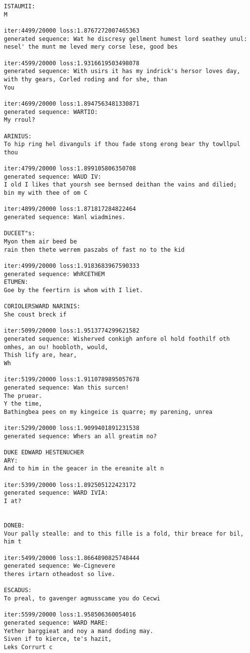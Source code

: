 \documentclass[11pt]{article}
\begin{document}
\begin{Verbatim}[commandchars=\\\{\}]
ISTAUMII:
M

iter:4499/20000 loss:1.8767272007465363
generated sequence: Wat he discresy gellment humest lord seathey unul: nesel' the munt me leved mery corse lese, good bes

iter:4599/20000 loss:1.9316619503498078
generated sequence: With usirs it has my indrick's hersor loves day, with thy gears, Corled roding and for she, than
You 

iter:4699/20000 loss:1.8947563481330871
generated sequence: WARTIO:
My rroul?

ARINIUS:
To hip ring hel divanguls if thou fade stong erong bear thy towllpul thou

iter:4799/20000 loss:1.899105806350708
generated sequence: WAUD IV:
I old I likes that yoursh see bernsed deithan the vains and dilied; bin my with thee of om C

iter:4899/20000 loss:1.871817284822464
generated sequence: Wanl wiadmines.

DUCEET"s:
Myon them air beed be
rain then thete werrem paszabs of fast no to the kid

iter:4999/20000 loss:1.9183683967590333
generated sequence: WhRCETHEM
ETUMEN:
Goe by the feertirn is whom with I liet.

CORIOLERSWARD NARINIS:
She coust breck if

iter:5099/20000 loss:1.9513774299621582
generated sequence: Wisherved conkigh anfore ol hold foothilf oth omhes, an ou! hoobloth, would,
Thish lify are, hear,
Wh

iter:5199/20000 loss:1.9110789895057678
generated sequence: Wan this surcen!
The pruear.
Y the time,
Bathingbea pees on my kingeice is quarre; my parening, unrea

iter:5299/20000 loss:1.9099401891231538
generated sequence: Whers an all greatim no?

DUKE EDWARD HESTENUCHER
ARY:
And to him in the geacer in the ereanite alt n

iter:5399/20000 loss:1.892505122423172
generated sequence: WARD IVIA:
I at?


DONEB:
Vour pally stealle: and to this fille is a fold, thir breace for bil, him t

iter:5499/20000 loss:1.8664890825748444
generated sequence: We-Cignevere
theres irtarn otheadost so live.

ESCADUS:
To preal, to gavenger agmusscame you do Cecwi

iter:5599/20000 loss:1.958506360054016
generated sequence: WARD MARE:
Yether barggieat and noy a mand doding may.
Siven if to kierce, te's hazit,
Leks Corrurt c


\end{Verbatim}
\end{document}
